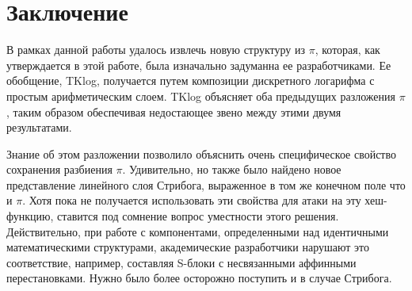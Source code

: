 \section{Заключение}
В рамках данной работы удалось извлечь новую структуру из \(\pi\), которая, как утверждается в этой работе, была изначально задуманна ее разработчиками. Ее обобщение, TKlog, получается путем композиции дискретного логарифма с простым арифметическим слоем. TKlog объясняет оба предыдущих разложения \(\pi\), таким образом обеспечивая недостающее звено между этими двумя результатами.

Знание об этом разложении позволило объяснить очень специфическое свойство сохранения разбиения \(\pi\). Удивительно, но также было найдено новое представление линейного слоя Стрибога, выраженное в том же конечном поле что и \(\pi\). Хотя пока не получается использовать эти свойства для атаки на эту хеш-функцию, ставится под сомнение вопрос уместности этого решения. Действительно, при работе с компонентами, определенными над идентичными математическими структурами, академические разработчики нарушают это соответствие, например, составляя S-блоки с несвязанными аффинными перестановками. Нужно было более осторожно поступить и в случае Стрибога.

